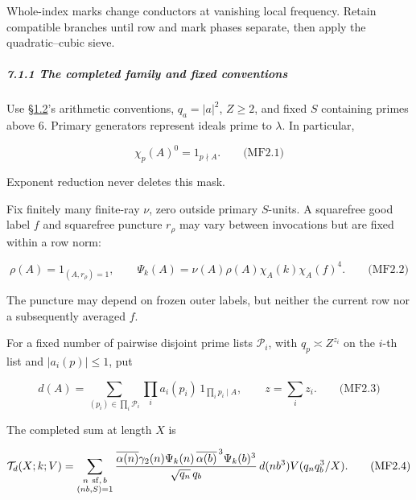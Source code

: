 Whole-index marks change conductors at vanishing local frequency. Retain compatible branches until row and mark phases separate, then apply the quadratic--cubic sieve.

\hypertarget{the-completed-family-and-fixed-conventions}{}

\label{the-completed-family-and-fixed-conventions}

\hypertarget{the-completed-family-and-fixed-conventions-heading-2}{%
\subparagraph{7.1.1 The completed family and fixed conventions}}

Use §\protect\hyperlink{cf:sec:1.1}{1.2}'s arithmetic conventions, \(q_a=|a|^2\), \(Z\ge2\), and fixed \(S\) containing primes above \(6\). Primary generators represent ideals prime to \(\lambda\). In particular,

\hypertarget{mf:eq:B2.1}{}

\label{mf:eq:B2.1}

\[
\chi_p(A)^0=1_{p\nmid A}.
\qquad\text{(MF2.1)}
\]

Exponent reduction never deletes this mask.

Fix finitely many finite-ray \(\nu\), zero outside primary \(S\)-units. A squarefree good label \(f\) and squarefree puncture \(r_\rho\) may vary between invocations but are fixed within a row norm:

\hypertarget{mf:eq:B2.2}{}

\label{mf:eq:B2.2}

\[
\rho(A)=1_{(A,r_\rho)=1},\qquad
\Psi_k(A)=\nu(A)\rho(A)\chi_A(k)\chi_A(f)^4.
\qquad\text{(MF2.2)}
\]

The puncture may depend on frozen outer labels, but neither the current row nor a subsequently averaged \(f\).

For a fixed number of pairwise disjoint prime lists \(\mathcal P_i\), with \(q_p\asymp Z^{z_i}\) on the \(i\)-th list and \(|a_i(p)|\le1\), put

\hypertarget{mf:eq:B2.3}{}

\label{mf:eq:B2.3}

\[
d(A)=\sum_{(p_i)\in\prod_i\mathcal P_i}
       \prod_i a_i(p_i)\,1_{\prod_i p_i\mid A},
\qquad z=\sum_i z_i.
\qquad\text{(MF2.3)}
\]

The completed sum at length \(X\) is

\hypertarget{mf:eq:B2.4}{}

\label{mf:eq:B2.4}

\[
\mathcal T_d(X;k;V)=
\sum_{\substack{n\ {\rm sf},\,b\\ (nb,S)=1}}
\frac{\overline{\alpha(n)}\gamma_2(n)\Psi_k(n)\,
      \overline{\alpha(b)}^{\,3}\Psi_k(b)^3}
     {\sqrt{q_n}\,q_b}\,
d(nb^3)V(q_nq_b^3/X).
\qquad\text{(MF2.4)}
\]


